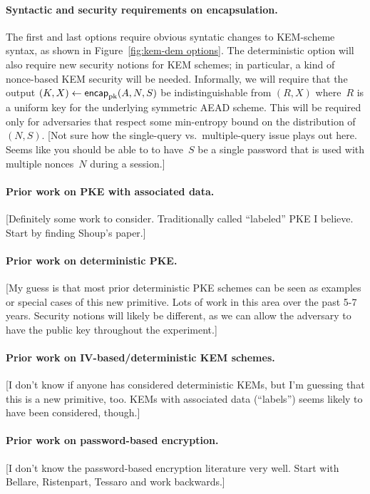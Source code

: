 \paragraph{Syntactic and security requirements on encapsulation. }  The first and last options require obvious syntatic changes to KEM-scheme syntax, as shown in Figure~\ref{fig:kem-dem options}.  The deterministic option will also require new security notions for KEM schemes; in particular, a kind of nonce-based KEM security will be needed.  Informally, we will require that the output $(K,X)\gets\mathsf{encap}_{\mathrm{pk}}(A,N,S)$ be indistinguishable from $(R,X)$ where~$R$ is a uniform key for the underlying symmetric AEAD scheme.  This will be required only for adversaries that respect some min-entropy bound on the distribution of $(N,S)$. [Not sure how the single-query vs.\ multiple-query issue plays out here.  Seems like you should be able to to have~$S$ be a single password that is used with multiple nonces~$N$ during a session.]

\paragraph{Prior work on PKE with associated data. } [Definitely some work to consider.  Traditionally called ``labeled'' PKE I believe.  Start by finding Shoup's paper.]

\paragraph{Prior work on deterministic PKE. } [My guess is that most prior deterministic PKE schemes can be seen as examples or special cases of this new primitive. Lots of work in this area over the past 5-7 years. Security notions will likely be different, as we can allow the adversary to have the public key throughout the experiment.]

\paragraph{Prior work on IV-based/deterministic KEM schemes. } [I don't know if anyone has considered deterministic KEMs, but I'm guessing that this is a new primitive, too.  KEMs with associated data (``labels'') seems likely to have been considered, though.]

\paragraph{Prior work on password-based encryption. } [I don't know the password-based encryption literature very well.  Start with Bellare, Ristenpart, Tessaro and work backwards.]

